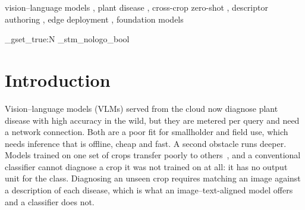 \documentclass[a4paper,fleqn]{cas-dc}
\begin{document}
\begin{abstract}
Cloud vision--language models diagnose plant disease well but bill per query and need
connectivity, and a conventional classifier has no output unit for an unseen crop. We ask what lets
a small, frozen vision--language model diagnose crops it was never trained on. On the SAGE dataset,
four frozen compact contrastive encoders of 11.4--86.3\,M parameters match leaf images to written
disease descriptions, and we compare seven ways of authoring those descriptions across nested
held-out sets of 16, 34 and 51 unseen classes. First, authoring outweighs model size: the best
descriptions gain 10.3--16.2 points over a bare class name, against 4.0--5.1 points between the
smallest and largest encoder, and authoring exceeds size at every configuration on both the full and
a de-duplicated label set. Second, per-class sentences describing each disease as it appears in a
photograph reach 30.9\% top-1 on 51 unseen classes, 7.4 times the majority-class prior, and beat
source-grounded descriptions by 7.0 points on all four encoders. Third, requiring a citable source
costs no measurable accuracy, and re-embedding the source-grounded text as a sentence ensemble
recovers only 4\% of its deficit, so the gap lies in the text rather than in citation or embedding.
The smallest encoder runs at 17.4\,ms per image on a laptop CPU in 45.8\,MB. For edge deployment,
effort spent on descriptions returns more than effort spent on parameters.
\end{abstract}

\begin{keywords}
vision--language models \sep
plant disease \sep
cross-crop zero-shot \sep
descriptor authoring \sep
edge deployment \sep
foundation models
\end{keywords}

\ExplSyntaxOn
\bool_gset_true:N \g_stm_nologo_bool
\ExplSyntaxOff
\maketitle

\section{Introduction}
\label{sec:intro}

Vision--language models (VLMs) served from the cloud now diagnose plant disease with high accuracy
in the wild, but they are metered per query and need a network connection. Both are a poor fit for
smallholder and field use, which needs inference that is offline, cheap and fast. A second obstacle
runs deeper. Models trained on one set of crops transfer poorly to others~\citep{bouacida2025}, and
a conventional classifier cannot diagnose a crop it was not trained on at all: it has no output unit
for the class. Diagnosing an unseen crop requires matching an image against a description of each
disease, which is what an image--text-aligned model offers and a classifier does not.
\end{document}

